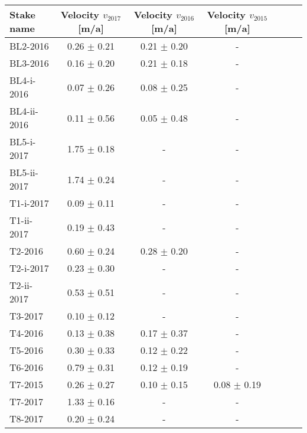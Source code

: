 \begin{tabular}{lcccccc}
\toprule
  Stake name & Velocity $v_{2017}$ [m/a] & Velocity $v_{2016}$ [m/a] & Velocity $v_{2015}$ [m/a] \\
\midrule
    BL2-2016 &           0.26 $\pm$ 0.21 &           0.21 $\pm$ 0.20 &                         - \\
    BL3-2016 &           0.16 $\pm$ 0.20 &           0.21 $\pm$ 0.18 &                         - \\
  BL4-i-2016 &           0.07 $\pm$ 0.26 &           0.08 $\pm$ 0.25 &                         - \\
 BL4-ii-2016 &           0.11 $\pm$ 0.56 &           0.05 $\pm$ 0.48 &                         - \\
  BL5-i-2017 &           1.75 $\pm$ 0.18 &                         - &                         - \\
 BL5-ii-2017 &           1.74 $\pm$ 0.24 &                         - &                         - \\
   T1-i-2017 &           0.09 $\pm$ 0.11 &                         - &                         - \\
  T1-ii-2017 &           0.19 $\pm$ 0.43 &                         - &                         - \\
     T2-2016 &           0.60 $\pm$ 0.24 &           0.28 $\pm$ 0.20 &                         - \\
   T2-i-2017 &           0.23 $\pm$ 0.30 &                         - &                         - \\
  T2-ii-2017 &           0.53 $\pm$ 0.51 &                         - &                         - \\
     T3-2017 &           0.10 $\pm$ 0.12 &                         - &                         - \\
     T4-2016 &           0.13 $\pm$ 0.38 &           0.17 $\pm$ 0.37 &                         - \\
     T5-2016 &           0.30 $\pm$ 0.33 &           0.12 $\pm$ 0.22 &                         - \\
     T6-2016 &           0.79 $\pm$ 0.31 &           0.12 $\pm$ 0.19 &                         - \\
     T7-2015 &           0.26 $\pm$ 0.27 &           0.10 $\pm$ 0.15 &           0.08 $\pm$ 0.19 \\
     T7-2017 &           1.33 $\pm$ 0.16 &                         - &                         - \\
     T8-2017 &           0.20 $\pm$ 0.24 &                         - &                         - \\
\bottomrule
\end{tabular}

